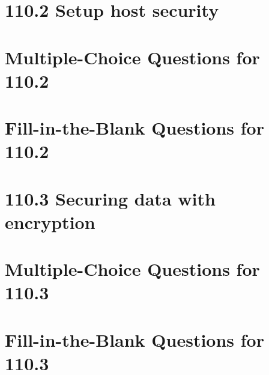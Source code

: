 \documentclass[a4paper]{report}
\begin{document}
\newpage
\section*{110.2 Setup host security}

\newpage
\section*{Multiple-Choice Questions for 110.2}

\newpage
\section*{Fill-in-the-Blank Questions for 110.2}

\newpage
\section*{110.3 Securing data with encryption}

\newpage
\section*{Multiple-Choice Questions for 110.3}

\newpage
\section*{Fill-in-the-Blank Questions for 110.3}

\clearpage
\end{document}
